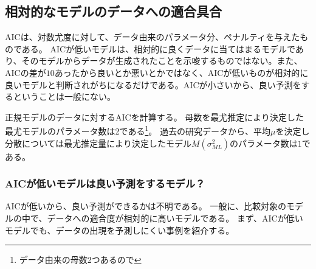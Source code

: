 \subsection{相対的なモデルのデータへの適合具合}
AICは、対数尤度に対して、データ由来のパラメータ分、ペナルティを与えたものである。
AICが低いモデルは、相対的に良くデータに当てはまるモデルであり、そのモデルからデータが生成されたことを示唆するものではない。また、AICの差が$10$あったから良いとか悪いとかではなく、AICが低いものが相対的に良いモデルと判断されがちになるだけである。AICが小さいから、良い予測をするということは一般にない。

正規モデルのデータに対するAICを計算する。
母数を最尤推定により決定した最尤モデルのパラメータ数は2である\footnote{データ由来の母数2つあるので}。
過去の研究データから、平均$\mu$を決定し分散については最尤推定量により決定したモデル$M(\sigma^2_{ML})$のパラメータ数は$1$である。

\subsubsection{AICが低いモデルは良い予測をするモデル？}
AICが低いから、良い予測ができるかは不明である。
一般に、比較対象のモデルの中で、データへの適合度が相対的に高いモデルである。
まず、AICが低いモデルでも、データの出現を予測しにくい事例を紹介する。




